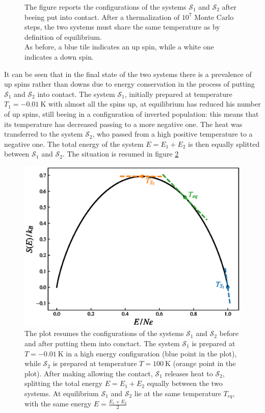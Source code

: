 \begin{figure}[hbtp]
\begin{minipage}[c]{0.45\textwidth}
    \end{minipage}
    \hfill
    \caption{The figure reports the configurations of the systems $\mathcal{S}_1$ and $\mathcal{S}_2$ after beeing put into contact. After a thermalization of $10^7$ Monte Carlo steps, the two systems must share the same temperature as by definition of equilibrium. \\
    As before, a blue tile indicates an up spin, while a white one indicates a down spin.}
    \label{fig:contact_final}
\end{figure}
It can be seen that in the final state of the two systems there is a prevalence of up spins rather than downs due to energy conservation in the process of putting $\mathcal{S}_1$ and $\mathcal{S}_2$ into contact. The system $\mathcal{S}_1$, initially prepared at temperature $T_1 = \SI{-0.01}{\kelvin}$ with almost all the spins up, at equilibrium has reduced his number of up spins, still
beeing in a configuration of inverted population: this means that its temperature has decreased passing to a more negative one. The heat was transferred to the system $\mathcal{S}_2$, who passed from a high positive temperature to a negative one. The total energy of the system $E = E_1 + E_2$ is then equally splitted between $\mathcal{S}_1$ and $\mathcal{S}_2$. The situation is resumed in figure \ref{fig:contact_E_S_1}
\begin{figure}
    \centering 
    \includegraphics[scale=0.7]{./images/ising/mixing_SE_plot.eps}
    \caption{The plot resumes the configurations of the systems $\mathcal{S}_1$ and $\mathcal{S}_2$ before and after putting them into conctact. The system $\mathcal{S}_1$ is prepared at $T = \SI{-0.01}{\kelvin}$ in a high energy configuration (blue point in the plot), while $\mathcal{S}_2$ is prepared at temperature $T = \SI{100}{\kelvin}$ (orange point in the plot). After making allowing the contact, 
    $\mathcal{S}_1$ releases heat to $\mathcal{S}_2$, splitting the total energy $E = E_1 + E_2$ equally between the two systems. At equilibrium $\mathcal{S}_1$ and $\mathcal{S}_2$ lie at the same temperature $T_{eq}$, with the same energy $E = \frac{E_1 + E_2}{2}$}
    \label{fig:contact_E_S_1}
\end{figure}